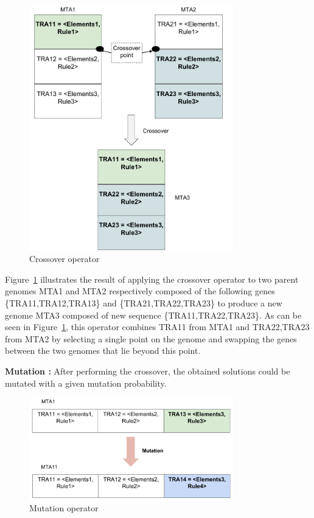 \documentclass[conference]{IEEEtran}
\begin{document}
\begin{figure}[!ht]
\centering
\includegraphics[width=3.49in]{crossover.pdf}
\caption{Crossover operator}
\label{crossover}
\end{figure}

Figure~\ref{crossover} illustrates the result of applying the crossover operator to two parent genomes MTA1 and MTA2 respectively composed of the following genes \{TRA11,TRA12,TRA13\} and \{TRA21,TRA22,TRA23\} to produce a new genome MTA3 composed of new sequence \{TRA11,TRA22,TRA23\}. As can be seen in Figure~\ref{crossover}, this operator combines TRA11 from MTA1 and {TRA22,TRA23} from MTA2 by selecting a single point on the genome and swapping the genes between the two genomes that lie beyond this point. 

\textbf{Mutation :}
After performing the crossover, the obtained solutions could be mutated with a given mutation probability.

\begin{figure}[!ht]
\centering
\includegraphics[width=3.49in]{mutation.pdf}
\caption{Mutation operator}
\label{mutation}
\end{figure}
\end{document}
